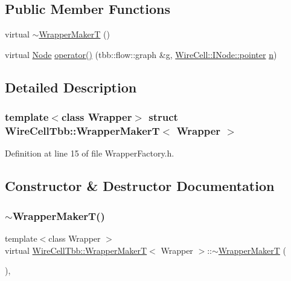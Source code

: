 \subsection*{Public Member Functions}
\begin{DoxyCompactItemize}
\item 
virtual \hyperlink{struct_wire_cell_tbb_1_1_wrapper_maker_t_a0309b8bee3e30e37019a9a465209ce2c}{$\sim$\+Wrapper\+MakerT} ()
\item 
virtual \hyperlink{namespace_wire_cell_tbb_aa7b6ff37a20e0174babf0614286bb59f}{Node} \hyperlink{struct_wire_cell_tbb_1_1_wrapper_maker_t_a582bbbeb058f68e79dd61c8c539e2718}{operator()} (tbb\+::flow\+::graph \&g, \hyperlink{class_wire_cell_1_1_interface_a09c548fb8266cfa39afb2e74a4615c37}{Wire\+Cell\+::\+I\+Node\+::pointer} \hyperlink{format_8h_a9ab7e5832cef391eb8b1505a601fb215}{n})
\end{DoxyCompactItemize}


\subsection{Detailed Description}
\subsubsection*{template$<$class Wrapper$>$\newline
struct Wire\+Cell\+Tbb\+::\+Wrapper\+Maker\+T$<$ Wrapper $>$}



Definition at line 15 of file Wrapper\+Factory.\+h.



\subsection{Constructor \& Destructor Documentation}
\mbox{\label{struct_wire_cell_tbb_1_1_wrapper_maker_t_a0309b8bee3e30e37019a9a465209ce2c}} 
\subsubsection{\texorpdfstring{$\sim$\+Wrapper\+Maker\+T()}{~WrapperMakerT()}}
{\footnotesize\ttfamily template$<$class Wrapper $>$ \\
virtual \hyperlink{struct_wire_cell_tbb_1_1_wrapper_maker_t}{Wire\+Cell\+Tbb\+::\+Wrapper\+MakerT}$<$ Wrapper $>$\+::$\sim$\hyperlink{struct_wire_cell_tbb_1_1_wrapper_maker_t}{Wrapper\+MakerT} (\begin{DoxyParamCaption}{ }\end{DoxyParamCaption})\hspace{0.3cm}{\ttfamily [inline]}, {\ttfamily [virtual]}}



